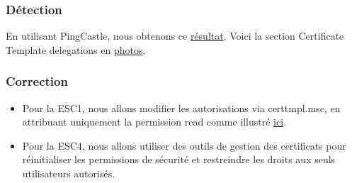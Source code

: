 \documentclass{article}
\begin{document}
\subsubsection{Détection}
En utilisant PingCastle, nous obtenons ce \href{https://github.com/MikeHorn-git/ADSecOps/assets/objects-number.txt}{résultat}. Voici la section Certificate Template delegations en \href{https://github.com/MikeHorn-git/ADSecOps/blob/main/assets/pictures/pingcastle_acds.png}{photos}.

\subsubsection{Correction}
\begin{itemize}
    \item Pour la ESC1, nous allons modifier les autorisations via certtmpl.msc, en attribuant uniquement la permission read comme illustré \href{https://github.com/MikeHorn-git/ADSecOps/blob/main/assets/pictures/certtmpl_ESC1.png}{ici}.
    \item Pour la ESC4, nous allons utiliser des outils de gestion des certificats pour réinitialiser les permissions de sécurité et restreindre les droits aux seuls utilisateurs autorisés.
\end{itemize}
\end{document}
